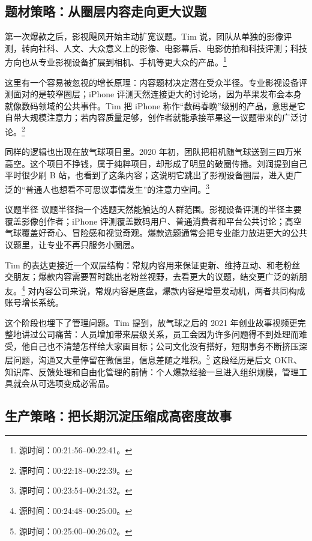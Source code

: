 \documentclass[a4paper]{article}
\begin{document}
\subsection{题材策略：从圈层内容走向更大议题}

第一次爆款之后，影视飓风开始主动扩宽议题。Tim 说，团队从单独的影像评测，转向社科、人文、大众意义上的影像、电影幕后、电影仿拍和科技评测；科技方向也从专业影视设备扩展到相机、手机等更大众的产品。\footnote{源时间：00:21:56--00:22:41。}

这里有一个容易被忽视的增长原理：内容题材决定潜在受众半径。专业影视设备评测面对的是较窄圈层；iPhone 评测天然连接更大的讨论场，因为苹果发布会本身就像数码领域的公共事件。Tim 把 iPhone 称作“数码春晚”级别的产品，意思是它自带大规模注意力；若内容质量足够，创作者就能承接苹果这一议题带来的广泛讨论。\footnote{源时间：00:22:18--00:22:39。}

同样的逻辑也出现在放气球项目里。2020 年初，团队把相机随气球送到三四万米高空。这个项目不挣钱，属于纯粹项目，却形成了明显的破圈传播。刘润提到自己平时很少刷 B 站，也看到了这条内容；这说明它跳出了影视设备圈层，进入更广泛的“普通人也想看不可思议事情发生”的注意力空间。\footnote{源时间：00:23:54--00:24:32。}

\begin{knowledgebox}{议题半径}
议题半径指一个选题天然能触达的人群范围。影视设备评测的半径主要覆盖影像创作者；iPhone 评测覆盖数码用户、普通消费者和平台公共讨论；高空气球覆盖好奇心、冒险感和视觉奇观。爆款选题通常会把专业能力放进更大的公共议题里，让专业不再只服务小圈层。
\end{knowledgebox}

Tim 的表达更接近一个双层结构：常规内容用来保证更新、维持互动、和老粉丝交朋友；爆款内容需要暂时跳出老粉丝视野，去看更大的议题，结交更广泛的新朋友。\footnote{源时间：00:24:48--00:25:00。} 对内容公司来说，常规内容是底盘，爆款内容是增量发动机，两者共同构成账号增长系统。

这个阶段也埋下了管理问题。Tim 提到，放气球之后的 2021 年创业故事视频更完整地讲过公司痛苦：人员增加带来层级关系，员工会因为许多问题得不到处理而难受，他自己也不清楚怎样给大家画目标；公司文化没有搭好，短期事务不断挤压深层问题，沟通又大量停留在微信里，信息差随之堆积。\footnote{源时间：00:25:00--00:26:02。} 这段经历是后文 OKR、知识库、反馈处理和自由化管理的前情：个人爆款经验一旦进入组织规模，管理工具就会从可选项变成必需品。

\subsection{生产策略：把长期沉淀压缩成高密度故事}
\end{document}
